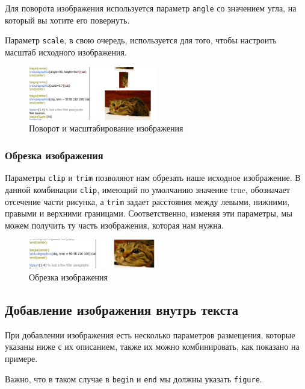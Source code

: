 \documentclass[a4paper,12pt]{article}
\begin{document}
Для поворота изображения используется параметр \texttt{angle} со значением угла, на который вы хотите его повернуть.

Параметр \texttt{scale}, в свою очередь, используется для того, чтобы настроить масштаб исходного изображения.

\begin{figure}[h]
\centering
\includegraphics[width=0.5\textwidth]{3.JPG}
\caption{Поворот и масштабирование изображения}
\label{fig:rotate_scale}
\end{figure}

\subsubsection{Обрезка изображения}

Параметры \texttt{clip} и \texttt{trim} позволяют нам обрезать наше исходное изображение. В данной комбинации \texttt{clip}, имеющий по умолчанию значение true, обозначает отсечение части рисунка, а \texttt{trim} задает расстояния между левыми, нижними, правыми и верхними границами. Соответственно, изменяя эти параметры, мы можем получить ту часть изображения, которая нам нужна.

\begin{figure}[h]
\centering
\includegraphics[width=0.5\textwidth]{4.JPG}
\caption{Обрезка изображения}
\label{fig:clip_trim}
\end{figure}

\subsection{Добавление изображения внутрь текста}

При добавлении изображения есть несколько параметров размещения, которые указаны ниже с их описанием, также их можно комбинировать, как показано на примере.

Важно, что в таком случае в \texttt{begin} и \texttt{end} мы должны указать \texttt{figure}.
\end{document}
